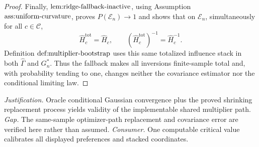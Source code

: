 \documentclass{article}
\begin{document}
\begin{proof}
Finally, \(\textnormal{lem:ridge-fallback-inactive}\), using Assumption \(\textnormal{ass:uniform-curvature}\), proves \(P(\mathcal E_n)\to1\) and shows that on \(\mathcal E_n\), simultaneously for all \(c\in\mathcal C\),
\[
 \widehat H_c^{\mathrm{tot}}=\widehat H_c,
 \qquad
 (\widehat H_c^{\mathrm{tot}})^{-1}=\widehat H_c^{-1}.
\]
Definition \(\textnormal{def:multiplier-bootstrap}\) uses this same totalized influence stack in both \(\widehat\Gamma\) and \(G_n^*\).  Thus the fallback makes all inversions finite-sample total and, with probability tending to one, changes neither the covariance estimator nor the conditional limiting law.
\end{proof}
\par\smallskip\noindent \textit{Justification.} Oracle conditional Gaussian convergence plus the proved shrinking replacement process yields validity of the implementable shared multiplier path. \textit{Gap.} The same-sample optimizer-path replacement and covariance error are verified here rather than assumed. \textit{Consumer.} One computable critical value calibrates all displayed preferences and stacked coordinates.
\end{document}
